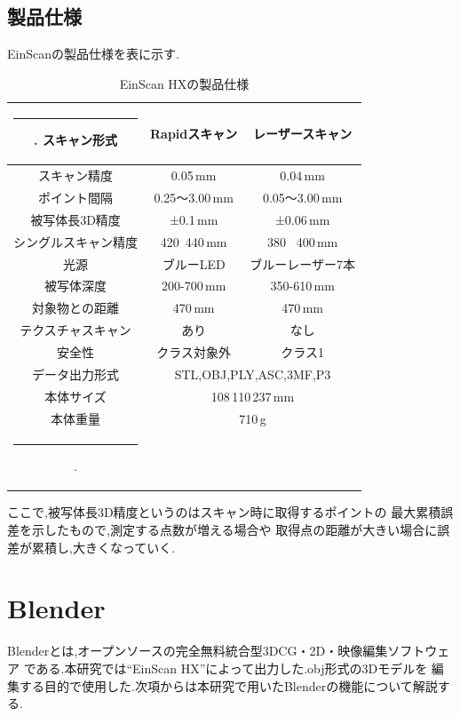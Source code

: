 \documentclass{ltjsreport}
\makeatletter
\def\Hline{
  \noalign{\ifnum0=`}\fi\hrule \@height 3.\arrayrulewidth \futurelet
  \reserved@a\@xhline}
\makeatother
\begin{document}
		\subsection{製品仕様}
			EinScanの製品仕様を表に示す.
			\begin{table}[H]
			\begin{center}
			\caption{EinScan HXの製品仕様}
			\label{tab:EinScan}
			\begin{tabular}{c|cc} \Hline
				スキャン形式&Rapidスキャン&レーザースキャン\\ \hline
				スキャン精度&0.05\,mm&0.04\,mm\\
				ポイント間隔&0.25～3.00\,mm&0.05～3.00\,mm\\
				被写体長3D精度&±0.1\,mm&±0.06\,mm\\
				シングルスキャン精度&420 \times \,440\,mm&380 \times\, 400\,mm\\
				光源&ブルーLED&ブルーレーザー7本\\
				被写体深度&200-700\,mm&350-610\,mm\\
				対象物との距離&470\,mm&470\,mm\\
				テクスチャスキャン&あり&なし\\
				安全性&クラス対象外&クラス1\\ \hline
				データ出力形式&\multicolumn{2}{c}{STL,OBJ,PLY,ASC,3MF,P3}\\
				本体サイズ&\multicolumn{2}{c}{108\times\,110\times\,237\,mm}\\
				本体重量&\multicolumn{2}{c}{710\,g}\\ \Hline
			\end{tabular}
			\end{center}
			\hspace{-32truemm}
			\end{table}
			ここで,被写体長3D精度というのはスキャン時に取得するポイントの
			最大累積誤差を示したもので,測定する点数が増える場合や
			取得点の距離が大きい場合に誤差が累積し,大きくなっていく.

	\section{Blender}
		Blenderとは,オープンソースの完全無料統合型3DCG・2D・映像編集ソフトウェア
		である.本研究では``EinScan HX''によって出力した.obj形式の3Dモデルを
		編集する目的で使用した.次項からは本研究で用いたBlenderの機能について解説する.
\end{document}
